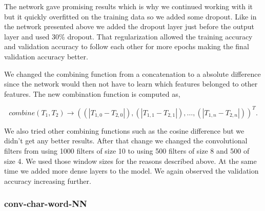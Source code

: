 The network gave promising results which is why we continued working with it but
it quickly overfitted on the training data so we added some dropout. Like in
the network presented above we added the dropout layer just before the output
layer and used 30\% dropout. That regularization allowed the training accuracy
and validation accuracy to follow each other for more epochs making the final
validation accuracy better.

We changed the combining function from a concatenation to a absolute difference
since the network would then not have to learn which features belonged to other
features. The new combination function is computed as,

\begin{equation}
    combine(T_1, T_2) \rightarrow \left(
        (|T_{1,0} - T_{2,0}|), (|T_{1,1} - T_{2,1}|), \dots, (|T_{1,n} - T_{2,n}|)
    \right)^T.
\end{equation}

We also tried other combining functions such as the cosine difference but we
didn't get any better results. After that change we changed the convolutional
filters from using 1000 filters of size 10 to using 500 filters of size 8 and
500 of size 4. We used those window sizes for the reasons described above. At
the same time we added more dense layers to the model. We again observed the
validation accuracy increasing further.


\subsubsection{\glsdesc{conv-char-word-NN}}
\label{subsubsec:conv_char_word_nn}



